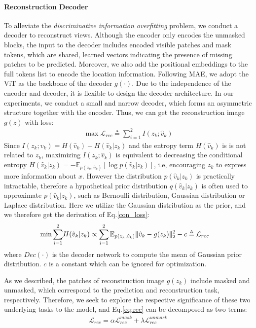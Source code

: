 \documentclass[10pt,twocolumn,letterpaper]{article}
\begin{document}
\paragraph{Reconstruction Decoder}
To alleviate the \textit{discriminative information overfitting} problem, we conduct a decoder to reconstruct views. Although the encoder only encodes the unmasked blocks, the input to the decoder includes encoded visible patches and mask tokens, which are shared, learned vectors indicating the presence of missing patches to be predicted. Moreover, we also add the positional embeddings to the full tokens list to encode the location information. Following MAE, we adopt the ViT as the backbone of the decoder $g(\cdot)$. Due to the independence of the encoder and decoder, it is flexible to design the decoder architecture. In our experiments, we conduct a small and narrow decoder, which forms an asymmetric structure together with the encoder.
Thus, we can get the reconstruction image $g(z)$ with loss:
\begin{align}
    \max\mathcal{L}_{rec}\triangleq\sum_{i=1}^{2}I(z_k;\hat{v}_k)
    \label{con_loss}
\end{align}
Since $I(z_k;\hat{v}_k)=H(\hat{v}_k)-H(\hat{v}_k|z_k)$ and the entropy term $H(\hat{v}_k)$ is is not related to $z_k$, maximizing $I(z_k;\hat{v}_k)$ is equivalent to decreasing the conditional entropy $H(\hat{v}_k|z_k)=-\mathbb{E}_{p(z_k,\hat{v}_k)}[\log p(\hat{v}_k|z_k)]$, i.e, encouraging $z_k$ to express more information about $x$. However the distribution $p(\hat{v}_k|z_k)$ is practically intractable, therefore a hypothetical prior distribution $q(\hat{v}_k|z_k)$ is often used to approximate $p(\hat{v}_k|z_k)$, such as Bernoulli distribution, Gaussian distribution or
Laplace distribution. Here we utilize the Gaussian distribution as the prior, and we therefore get the derivation of Eq.\eqref{con_loss}:
\begin{align}
\small
    \min \sum_{i=1}^2 &H(\hat{v}_k|z_k) \propto\sum_{i=1}^2\mathbb{E}_{p(z_k,\hat{v}_k)}\|\hat{v}_k-g(z_k)\|_2^2-c\triangleq\mathcal{L}_{rec}
\label{eq:rec}
\end{align}
where $Dec(\cdot)$ is the decoder network to compute the mean of Gaussian prior distribution. $c$ is a constant which can be ignored for optimization.

As we described, the patches of reconstruction image $g(z_k)$ include masked and unmasked, which correspond to the prediction and reconstruction task, respectively. Therefore, we seek to explore the respective significance of these two underlying tasks to the model, and Eq.\eqref{eq:rec} can be decomposed as two terms:
\begin{align}
    \mathcal{L}_{rec}=\alpha\mathcal{L}_{rec}^{mask}+\lambda\mathcal{L}_{rec}^{unmask}
\label{eq:rec_de}
\end{align}
\end{document}
